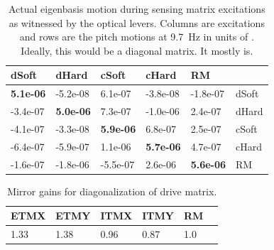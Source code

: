 



\begin{table}
\centering
\caption[Actual eigenbasis motion during sensing matrix excitations]{Actual eigenbasis motion during sensing matrix excitations as
  witnessed by the optical levers. Columns are excitations and rows are
  the pitch motions at 9.7~Hz in units of \microrad. Ideally, this
  would be a diagonal matrix. It mostly is.}
\begin{tabular}{l l l l l l}
\hline
dSoft & dHard  & cSoft & cHard & RM & \\
\hline
   \textbf{5.1e-06} & -5.2e-08  & 6.1e-07 & -3.8e-08 &  -1.8e-07 & dSoft\\
  -3.4e-07 &  \textbf{5.0e-06}  &  7.3e-07 & -1.0e-06 &  2.4e-07 & dHard\\
  -4.1e-07 & -3.3e-08 &  \textbf{5.9e-06} &  6.8e-07 &  2.5e-07 & cSoft\\
  -6.4e-07 & -5.9e-07 &  1.1e-06 &  \textbf{5.7e-06} &  4.7e-07 & cHard\\
  -1.6e-07 & -1.8e-06 & -5.5e-07 &   2.6e-06 &  \textbf{5.6e-06} & RM\\
\hline
\end{tabular}
\label{table:excitations_calibrated}
\end{table}



\begin{table}
\centering
\caption[Mirror gains for diagonalization of drive matrix]{Mirror
  gains for diagonalization of drive matrix.} 
\begin{tabular}{l l l l l l}
\hline
ETMX & ETMY & ITMX & ITMY & RM & \\
\hline
1.33 & 1.38 & 0.96 & 0.87 & 1.0 \\
\hline
\end{tabular}
\label{table:mirrorgains}
\end{table}




